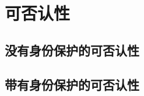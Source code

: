 \section{可否认性}\label{sec:21-7}

\subsection{没有身份保护的可否认性}\label{subsec:21-7-1}

\subsection{带有身份保护的可否认性}\label{subsec:21-7-2}